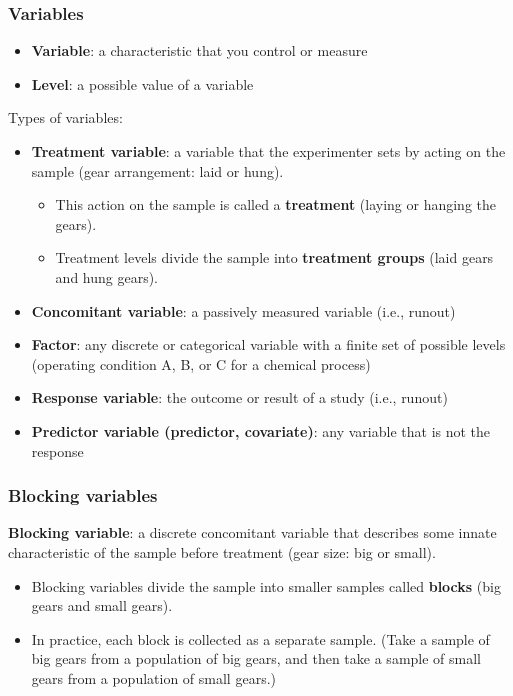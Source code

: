 \documentclass[handout]{beamer}
\numberwithin{equation}{section}
\begin{document}
\begin{frame}
\frametitle{Variables} \scriptsize

\begin{itemize}
\item  {\bf Variable}: a characteristic that you control or measure
\pause \item {\bf Level}: a possible value of a variable
\end{itemize}

\pause Types of variables:

\begin{itemize}
\item {\bf Treatment variable}: a variable that the experimenter sets by acting on the sample (gear arrangement: laid or hung).
\begin{itemize}
\pause \item This action on the sample is called a {\bf treatment} (laying or hanging the gears).
\pause \item Treatment levels divide the sample into {\bf treatment groups} (laid gears and hung gears).
\end{itemize}
\pause \item {\bf Concomitant variable}: a passively measured variable (i.e., runout)
\pause \item {\bf Factor}: any discrete or categorical variable with a finite set of possible levels (operating condition A, B, or C for a chemical process)
\pause \item {\bf Response variable}: the outcome or result of a study (i.e., runout)
\pause \item {\bf Predictor variable (predictor, covariate)}: any variable that is not the response
\end{itemize}
\end{frame}


\begin{frame}
\frametitle{Blocking variables}

{\bf Blocking variable}: a discrete concomitant variable that describes some innate characteristic of the sample before treatment (gear size: big or small).  
\begin{itemize}
\pause \item Blocking variables divide the sample into smaller samples called {\bf blocks} (big gears and small gears).
\pause \item In practice, each block is collected as a separate sample. (Take a sample of big gears from a population of big gears, and then take a sample of small gears from a population of small gears.)
\end{itemize}
\end{frame}
\end{document}
